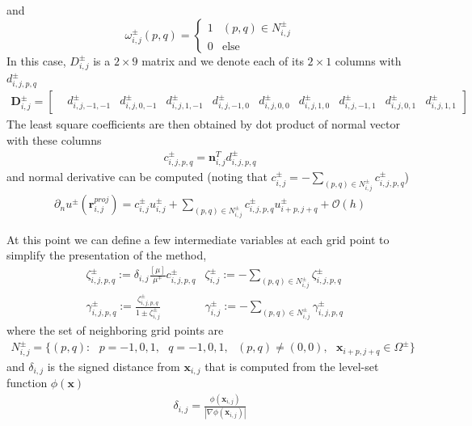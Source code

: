 \documentclass{elsarticle}
\begin{document}
and
\begin{equation}
	\omega_{i,j}^\pm (p,q) = \begin{cases}
		1 & (p,q)\in N_{i,j}^\pm \\
		0 & \text{else}
	\end{cases}
\end{equation}
In this case, $D^\pm_{i,j}$ is a $2\times 9$ matrix and we denote each of its $2\times 1$ columns with $d^\pm_{i,j,p,q}$
\begin{align*}
	\mathbf{D}^\pm_{i,j}  = \begin{bmatrix}
		 & d^\pm_{i,j,-1,-1} & d^\pm_{i,j,0,-1} & d^\pm_{i,j,1,-1} & d^\pm_{i,j,-1,0} & d^\pm_{i,j,0,0} & d^\pm_{i,j,1,0} & d^\pm_{i,j,-1,1} & d^\pm_{i,j,0,1} & d^\pm_{i,j,1,1}
	\end{bmatrix}
\end{align*}
The least square coefficients are then obtained by dot product of normal vector with these columns
\begin{align*}
	c^\pm_{i,j,p,q} = \mathbf{n}_{i,j}^T  d^\pm_{i,j,p,q}
\end{align*}
and normal derivative can be computed (noting that $c_{i,j}^\pm =-\sum_{(p,q)\in N_{i,j}^\pm}c_{i,j,p,q}^\pm$)
\begin{align*}
\partial_n u^\pm (\mathbf{r}^{proj}_{i,j})= c_{i,j}^\pm u_{i,j}^\pm + \sum_{(p,q)\in N_{i,j}^\pm} c_{i,j,p,q}^\pm u_{i+p, j+q}^\pm + \mathcal{O}(h) 
\end{align*}

At this point we can define a few intermediate variables at each grid point to simplify the presentation of the method,
\begin{align*}
	 & \zeta_{i,j,p,q}^\pm := \delta_{i,j} \frac{[\mu]}{\mu^\mp}c_{i,j,p,q}^\pm  & \zeta_{i,j}^\pm := -\sum_{(p,q)\in N_{i,j}^\pm} \zeta_{i,j,p,q}^\pm   \\
	 & \gamma_{i,j,p,q}^\pm := \frac{\zeta_{i,j,p,q}^\pm}{1 \pm \zeta^\pm_{i,j}} & \gamma^\pm_{i,j} := -\sum_{(p,q)\in N_{i,j}^\pm} \gamma_{i,j,p,q}^\pm
\end{align*}
where the set of neighboring grid points are
\begin{align*}
	N_{i,j}^\pm = \{(p,q) :\ \ \  p=-1,0,1, \ \ \  q=-1,0,1, \ \ \ (p,q)\neq (0,0), \ \ \ \mathbf{x}_{i+p,j+q}\in \Omega^\pm \}
\end{align*}
and $\delta_{i,j}$ is the signed distance from $\mathbf{x}_{i,j}$ that is computed from the level-set function $\phi(\mathbf{x})$
\begin{align*}
	\delta_{i,j}=\frac{\phi(\mathbf{x}_{i,j})}{|\nabla \phi(\mathbf{x}_{i,j})|}
\end{align*}
\end{document}
